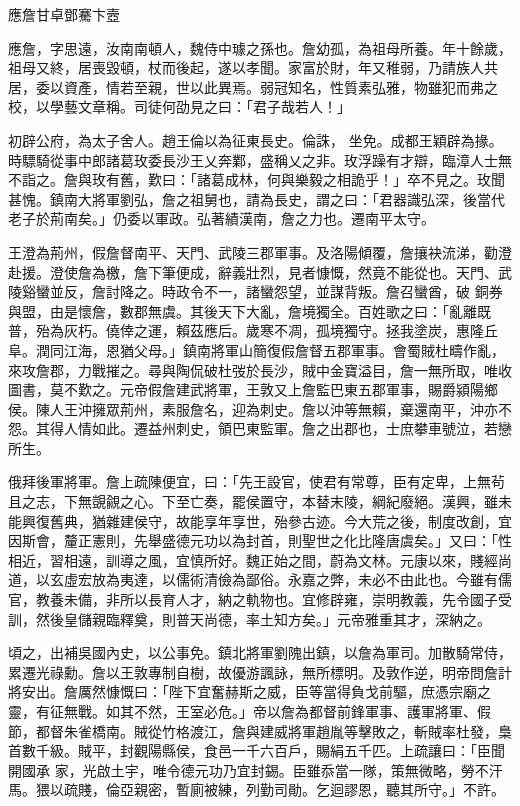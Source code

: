 
\begin{pinyinscope}
應詹甘卓鄧騫卞壼



 應詹，字思遠，汝南南頓人，魏侍中璩之孫也。詹幼孤，為祖母所養。年十餘歲，祖母又終，居喪毀頓，杖而後起，遂以孝聞。家富於財，年又稚弱，乃請族人共居，委以資產，情若至親，世以此異焉。弱冠知名，性質素弘雅，物雖犯而弗之校，以學藝文章稱。司徒何劭見之曰：「君子哉若人！」



 初辟公府，為太子舍人。趙王倫以為征東長史。倫誅，
 坐免。成都王穎辟為掾。時驃騎從事中郎諸葛玫委長沙王乂奔鄴，盛稱乂之非。玫浮躁有才辯，臨漳人士無不詣之。詹與玫有舊，歎曰：「諸葛成林，何與樂毅之相詭乎！」卒不見之。玫聞甚愧。鎮南大將軍劉弘，詹之祖舅也，請為長史，謂之曰：「君器識弘深，後當代老子於荊南矣。」仍委以軍政。弘著績漢南，詹之力也。遷南平太守。



 王澄為荊州，假詹督南平、天門、武陵三郡軍事。及洛陽傾覆，詹攘袂流涕，勸澄赴援。澄使詹為檄，詹下筆便成，辭義壯烈，見者慷慨，然竟不能從也。天門、武陵谿蠻並反，詹討降之。時政令不一，諸蠻怨望，並謀背叛。詹召蠻酋，破
 銅券與盟，由是懷詹，數郡無虞。其後天下大亂，詹境獨全。百姓歌之曰：「亂離既普，殆為灰朽。僥倖之運，賴茲應后。歲寒不凋，孤境獨守。拯我塗炭，惠隆丘阜。潤同江海，恩猶父母。」鎮南將軍山簡復假詹督五郡軍事。會蜀賊杜疇作亂，來攻詹郡，力戰摧之。尋與陶侃破杜弢於長沙，賊中金寶溢目，詹一無所取，唯收圖書，莫不歎之。元帝假詹建武將軍，王敦又上詹監巴東五郡軍事，賜爵潁陽鄉侯。陳人王沖擁眾荊州，素服詹名，迎為刺史。詹以沖等無賴，棄還南平，沖亦不怨。其得人情如此。遷益州刺史，領巴東監軍。詹之出郡也，士庶攀車號泣，若戀
 所生。



 俄拜後軍將軍。詹上疏陳便宜，曰：「先王設官，使君有常尊，臣有定卑，上無茍且之志，下無覬覦之心。下至亡奏，罷侯置守，本替末陵，綱紀廢絕。漢興，雖未能興復舊典，猶雜建侯守，故能享年享世，殆參古迹。今大荒之後，制度改創，宜因斯會，釐正憲則，先舉盛德元功以為封首，則聖世之化比隆唐虞矣。」又曰：「性相近，習相遠，訓導之風，宜慎所好。魏正始之間，蔚為文林。元康以來，賤經尚道，以玄虛宏放為夷達，以儒術清儉為鄙俗。永嘉之弊，未必不由此也。今雖有儒官，教養未備，非所以長育人才，納之軌物也。宜修辟雍，崇明教義，先令國子受
 訓，然後皇儲親臨釋奠，則普天尚德，率土知方矣。」元帝雅重其才，深納之。



 頃之，出補吳國內史，以公事免。鎮北將軍劉隗出鎮，以詹為軍司。加散騎常侍，累遷光祿勳。詹以王敦專制自樹，故優游諷詠，無所標明。及敦作逆，明帝問詹計將安出。詹厲然慷慨曰：「陛下宜奮赫斯之威，臣等當得負戈前驅，庶憑宗廟之靈，有征無戰。如其不然，王室必危。」帝以詹為都督前鋒軍事、護軍將軍、假節，都督朱雀橋南。賊從竹格渡江，詹與建威將軍趙胤等擊敗之，斬賊率杜發，梟首數千級。賊平，封觀陽縣侯，食邑一千六百戶，賜絹五千匹。上疏讓曰：「臣聞開國承
 家，光啟土宇，唯令德元功乃宜封錫。臣雖忝當一隊，策無微略，勞不汗馬。猥以疏賤，倫亞親密，暫廁被練，列勤司勛。乞迴謬恩，聽其所守。」不許。




\end{pinyinscope}
